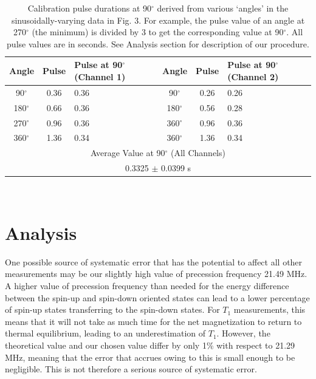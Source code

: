 \documentclass[aps,prl,nofootinbib,twocolumn,superscriptaddress,groupedaddress]{revtex4}  %
\begin{document}
\twocolumngrid
\begin{table}[t]
\caption{Calibration pulse durations at 90$^{\circ}$ derived from various `angles' in the sinusoidally-varying data in Fig. 3. For example, the pulse value of an angle at 270$^{\circ}$ (the minimum) is divided by 3 to get the corresponding value at 90$^{\circ}$. All pulse values are in seconds. See Analysis section for description of our procedure.}
\begin{ruledtabular}
\begin{tabular}{ccp{18mm}ccp{18 mm}}
Angle & Pulse & Pulse at 90$^{\circ}$ (Channel 1) & Angle & Pulse & Pulse at 90$^{\circ}$ (Channel 2)\\
\hline
90$^{\circ}$ & 0.36 & 0.36 & 90$^{\circ}$ & 0.26 & 0.26 \\
180$^{\circ}$ & 0.66 & 0.36 & 180$^{\circ}$ & 0.56 & 0.28 \\
270$^{\circ}$ & 0.96 & 0.36 & 360$^{\circ}$ & 0.96 & 0.36 \\
360$^{\circ}$ & 1.36 & 0.34 & 360$^{\circ}$ & 1.36 & 0.34 \\
\hline
\multicolumn{6}{c}{Average Value at 90$^{\circ}$ (All Channels)}\\
\multicolumn{6}{c}{0.3325 $\pm$ 0.0399 s}
\end{tabular}
\end{ruledtabular}
\end{table}
\
\section{Analysis}

One possible source of systematic error that has the potential to affect all other measurements may be our slightly high value of precession frequency 21.49 MHz. A higher value of precession frequency than needed for the energy difference between the spin-up and spin-down oriented states can lead to a lower percentage of  spin-up states transferring to the spin-down states. For $T_{1}$ measurements, this means that it will not take as much time for the net magnetization to return to thermal equilibrium, leading to an underestimation of $T_{1}$. However, the theoretical value and our chosen value differ by only 1\% with respect to 21.29 MHz, meaning that the error that accrues owing to this is small enough to be negligible. This is not therefore a serious source of systematic error. 
\end{document}
